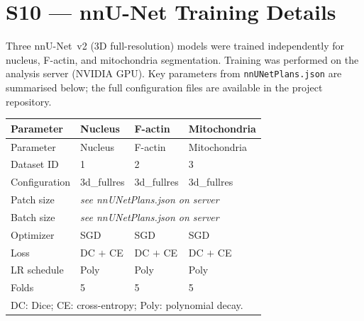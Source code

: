\documentclass[11pt,a4paper]{article}
\begin{document}
\section*{S10 — nnU-Net Training Details}
Three nnU-Net~v2 (3D full-resolution) models were trained independently for nucleus,
F-actin, and mitochondria segmentation. Training was performed on the analysis server
(NVIDIA GPU). Key parameters from \texttt{nnUNetPlans.json} are summarised below;
the full configuration files are available in the project repository.

\begin{longtable}{lp{3cm}p{3cm}p{3cm}}
\toprule
Parameter & Nucleus & F-actin & Mitochondria \\
\midrule\endfirsthead\toprule Parameter & Nucleus & F-actin & Mitochondria \\\midrule\endhead
\bottomrule\endfoot
Dataset ID & 1 & 2 & 3 \\
Configuration & 3d\_fullres & 3d\_fullres & 3d\_fullres \\
Patch size & \multicolumn{3}{l}{\textit{see nnUNetPlans.json on server}} \\
Batch size & \multicolumn{3}{l}{\textit{see nnUNetPlans.json on server}} \\
Optimizer & SGD & SGD & SGD \\
Loss & DC $+$ CE & DC $+$ CE & DC $+$ CE \\
LR schedule & Poly & Poly & Poly \\
Folds & 5 & 5 & 5 \\
\bottomrule
\multicolumn{4}{l}{\footnotesize DC: Dice; CE: cross-entropy; Poly: polynomial decay.} \\
\end{longtable}
\end{document}
